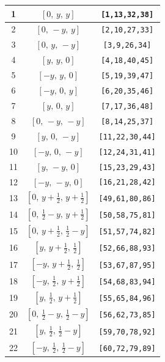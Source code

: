 \documentclass[fleqn,8pt]{jsarticle}
\begin{document}
\begin{longtable}{ccc}
1 & $\left[ 0,\, y,\, y \right]$ & {\tt [1,13,32,38]} \\ \hline
2 & $\left[ 0,\, - y,\, y \right]$ & {\tt [2,10,27,33]} \\ \hline
3 & $\left[ 0,\, y,\, - y \right]$ & {\tt [3,9,26,34]} \\ \hline
4 & $\left[ y,\, y,\, 0 \right]$ & {\tt [4,18,40,45]} \\ \hline
5 & $\left[ - y,\, y,\, 0 \right]$ & {\tt [5,19,39,47]} \\ \hline
6 & $\left[ - y,\, 0,\, y \right]$ & {\tt [6,20,35,46]} \\ \hline
7 & $\left[ y,\, 0,\, y \right]$ & {\tt [7,17,36,48]} \\ \hline
8 & $\left[ 0,\, - y,\, - y \right]$ & {\tt [8,14,25,37]} \\ \hline
9 & $\left[ y,\, 0,\, - y \right]$ & {\tt [11,22,30,44]} \\ \hline
10 & $\left[ - y,\, 0,\, - y \right]$ & {\tt [12,24,31,41]} \\ \hline
11 & $\left[ y,\, - y,\, 0 \right]$ & {\tt [15,23,29,43]} \\ \hline
12 & $\left[ - y,\, - y,\, 0 \right]$ & {\tt [16,21,28,42]} \\ \hline
13 & $\left[ 0,\, y + \frac{1}{2},\, y + \frac{1}{2} \right]$ & {\tt [49,61,80,86]} \\ \hline
14 & $\left[ 0,\, \frac{1}{2} - y,\, y + \frac{1}{2} \right]$ & {\tt [50,58,75,81]} \\ \hline
15 & $\left[ 0,\, y + \frac{1}{2},\, \frac{1}{2} - y \right]$ & {\tt [51,57,74,82]} \\ \hline
16 & $\left[ y,\, y + \frac{1}{2},\, \frac{1}{2} \right]$ & {\tt [52,66,88,93]} \\ \hline
17 & $\left[ - y,\, y + \frac{1}{2},\, \frac{1}{2} \right]$ & {\tt [53,67,87,95]} \\ \hline
18 & $\left[ - y,\, \frac{1}{2},\, y + \frac{1}{2} \right]$ & {\tt [54,68,83,94]} \\ \hline
19 & $\left[ y,\, \frac{1}{2},\, y + \frac{1}{2} \right]$ & {\tt [55,65,84,96]} \\ \hline
20 & $\left[ 0,\, \frac{1}{2} - y,\, \frac{1}{2} - y \right]$ & {\tt [56,62,73,85]} \\ \hline
21 & $\left[ y,\, \frac{1}{2},\, \frac{1}{2} - y \right]$ & {\tt [59,70,78,92]} \\ \hline
22 & $\left[ - y,\, \frac{1}{2},\, \frac{1}{2} - y \right]$ & {\tt [60,72,79,89]} \\ \hline

\end{longtable}
\end{document}
